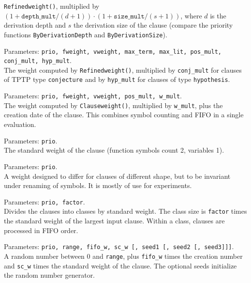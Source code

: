 \documentclass{report}
\begin{document}
\begin{description}
  \texttt{Refinedweight()}, multiplied by
  $(1+\mathtt{depth\_mult}/(d+1))\cdot(1+\mathtt{size\_mult}/(s+1))$,
  where $d$ is the derivation depth and $s$ the derivation size of the
  clause (compare the priority functions \texttt{ByDerivationDepth}
  and \texttt{ByDerivationSize}).
\item[\texttt{TPTPTypeweight}:] Parameters: \texttt{prio, fweight,
    vweight, max\_term, max\_lit, pos\_mult, conj\_mult,
    hyp\_mult}.\\
  The weight
  computed by \texttt{Refinedweight()}, multiplied by
  \texttt{conj\_mult} for clauses of TPTP type \texttt{conjecture} and
  by \texttt{hyp\_mult} for clauses of type \texttt{hypothesis}.
\item[\texttt{ClauseWeightAge}:] Parameters: \texttt{prio, fweight,
    vweight, pos\_mult, w\_mult}.\\
  The weight computed by \texttt{Clauseweight()},
  multiplied by \texttt{w\_mult}, plus the creation date of the
  clause. This combines symbol counting and FIFO in a single
  evaluation.
\item[\texttt{Defaultweight}:] Parameters: \texttt{prio}.\\
  The standard weight of the
  clause (function symbols count 2, variables 1).
\item[\texttt{Uniqweight}:] Parameters: \texttt{prio}.\\
  A weight designed to differ for
  clauses of different shape, but to be invariant under renaming of
  symbols. It is mostly of use for experiments.
\item[\texttt{StaggeredWeight}:] Parameters: \texttt{prio, factor}.\\
  Divides the clauses
  into classes by standard weight. The class size is \texttt{factor}
  times the standard weight of the largest input clause. Within a
  class, clauses are processed in FIFO order.
\item[\texttt{RandomWeight}:] Parameters: \texttt{prio, range,
    fifo\_w, sc\_w [, seed1 [, seed2 [, seed3]]]}.\\
  A random number between 0 and
  \texttt{range}, plus \texttt{fifo\_w} times the creation number and
  \texttt{sc\_w} times the standard weight of the clause. The optional
  seeds initialize the random number generator.
\end{description}
\end{document}
